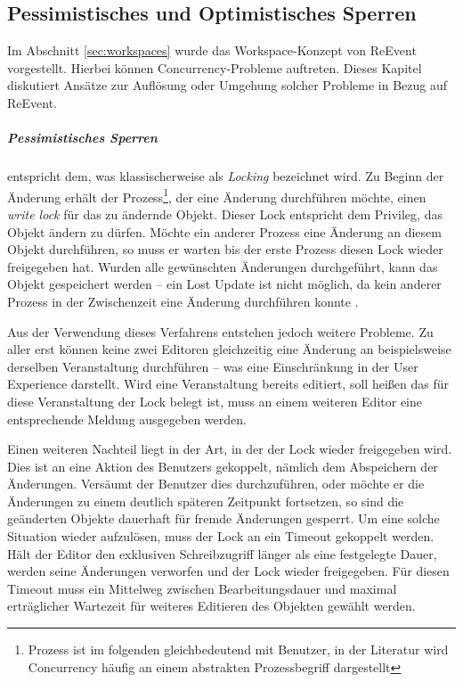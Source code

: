 
\begin{appendices}



\chapter{Pessimistisches und Optimistisches Sperren}
\label{ch:locking.workspaces}

Im Abschnitt \ref{sec:workspaces} wurde das Workspace-Konzept von ReEvent vorgestellt. Hierbei können Concurrency-Probleme auftreten. Dieses Kapitel diskutiert Ansätze zur Auflösung oder Umgehung solcher Probleme in Bezug auf ReEvent.

\paragraph{Pessimistisches Sperren} entspricht dem, was klassischerweise als \emph{Locking} bezeichnet wird. Zu Beginn der Änderung erhält der Prozess\footnote{Prozess ist im folgenden gleichbedeutend mit Benutzer, in der Literatur wird Concurrency häufig an einem abstrakten Prozessbegriff dargestellt}, der eine Änderung durchführen möchte, einen \emph{write lock} für das zu ändernde Objekt. Dieser Lock entspricht dem Privileg, das Objekt ändern zu dürfen. Möchte ein anderer Prozess eine Änderung an diesem Objekt durchführen, so muss er warten bis der erste Prozess diesen Lock wieder freigegeben hat. Wurden alle gewünschten Änderungen durchgeführt, kann das Objekt gespeichert werden -- ein Lost Update ist nicht möglich, da kein anderer Prozess in der Zwischenzeit eine Änderung durchführen konnte \cite[S. 311]{Harrington.2009}.

Aus der Verwendung dieses Verfahrens entstehen jedoch weitere Probleme. Zu aller erst können keine zwei Editoren gleichzeitig eine Änderung an beispielsweise derselben Veranstaltung durchführen -- was eine Einschränkung in der User Experience darstellt. Wird eine Veranstaltung bereits editiert, soll heißen das für diese Veranstaltung der Lock belegt ist, muss an einem weiteren Editor eine entsprechende Meldung ausgegeben werden.

Einen weiteren Nachteil liegt in der Art, in der der Lock wieder freigegeben wird. Dies ist an eine Aktion des Benutzers gekoppelt, nämlich dem Abspeichern der Änderungen. Versäumt der Benutzer dies durchzuführen, oder möchte er die Änderungen zu einem deutlich späteren Zeitpunkt fortsetzen, so sind die geänderten Objekte dauerhaft für fremde Änderungen gesperrt. Um eine solche Situation wieder aufzulösen, muss der Lock an ein Timeout gekoppelt werden. Hält der Editor den exklusiven Schreibzugriff länger als eine festgelegte Dauer, werden seine Änderungen verworfen und der Lock wieder freigegeben. Für diesen Timeout muss ein Mittelweg zwischen Bearbeitungsdauer und maximal erträglicher Wartezeit für weiteres Editieren des Objekten gewählt werden.


\end{appendices}
